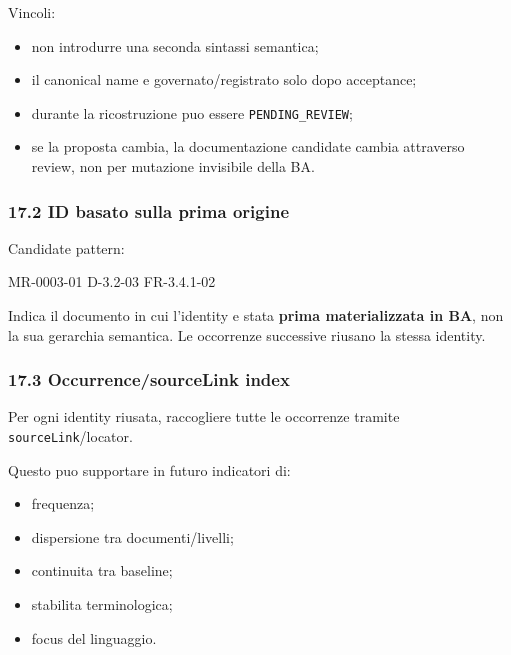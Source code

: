 \documentclass[
  9pt,
  a4paper,
]{article}
\newenvironment{Shaded}{}{}
\newcommand{\NormalTok}[1]{#1}
\providecommand{\tightlist}{%
  \setlength{\itemsep}{0pt}\setlength{\parskip}{0pt}}
\begin{document}
Vincoli:

\begin{itemize}
\tightlist
\item
  non introdurre una seconda sintassi semantica;
\item
  il canonical name e governato/registrato solo dopo acceptance;
\item
  durante la ricostruzione puo essere \texttt{PENDING\_REVIEW};
\item
  se la proposta cambia, la documentazione candidate cambia attraverso
  review, non per mutazione invisibile della BA.
\end{itemize}

\subsubsection{17.2 ID basato sulla prima
origine}\label{id-basato-sulla-prima-origine}

Candidate pattern:

\begin{Shaded}
\begin{Highlighting}[]
\NormalTok{MR{-}0003{-}01}
\NormalTok{D{-}3.2{-}03}
\NormalTok{FR{-}3.4.1{-}02}
\end{Highlighting}
\end{Shaded}

Indica il documento in cui l'identity e stata \textbf{prima
materializzata in BA}, non la sua gerarchia semantica. Le occorrenze
successive riusano la stessa identity.

\subsubsection{17.3 Occurrence/sourceLink
index}\label{occurrencesourcelink-index}

Per ogni identity riusata, raccogliere tutte le occorrenze tramite
\texttt{sourceLink}/locator.

Questo puo supportare in futuro indicatori di:

\begin{itemize}
\tightlist
\item
  frequenza;
\item
  dispersione tra documenti/livelli;
\item
  continuita tra baseline;
\item
  stabilita terminologica;
\item
  focus del linguaggio.
\end{itemize}
\end{document}
